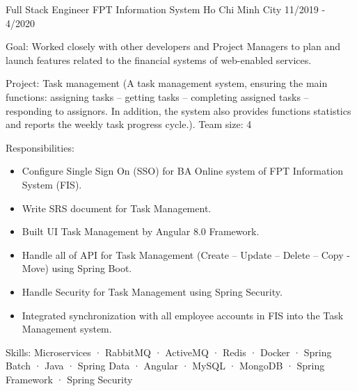 \cventry
    {Full Stack Engineer} %
    {FPT Information System} %
    {Ho Chi Minh City} %
    {11/2019 - 4/2020} %
    {
      \begin{cvitems} %
        \item {Goal: Worked closely with other developers and Project Managers to plan and launch features related to the financial systems of web-enabled services.}
        \item {Project: Task management (A task management system, ensuring the main functions: assigning tasks – getting tasks – completing assigned tasks – responding to assignors. In addition, the system also provides functions statistics and reports the weekly task progress cycle.). Team size: 4}
        \item {Responsibilities: }
        {
            \begin{itemize} %
                \item {Configure Single Sign On (SSO) for BA Online system of FPT Information System (FIS).}
                \item {Write SRS document for Task Management.}
                \item {Built UI Task Management by Angular 8.0 Framework.}
                \item {Handle all of API for Task Management (Create – Update – Delete – Copy - Move) using Spring Boot.}
                \item {Handle Security for Task Management using Spring Security.}
                \item {Integrated synchronization with all employee accounts in FIS into the Task Management system.}
            \end{itemize}
        }
        \item {Skills: Microservices · RabbitMQ · ActiveMQ · Redis · Docker · Spring Batch · Java · Spring Data · Angular · MySQL · MongoDB · Spring Framework · Spring Security}
      \end{cvitems}
    }
